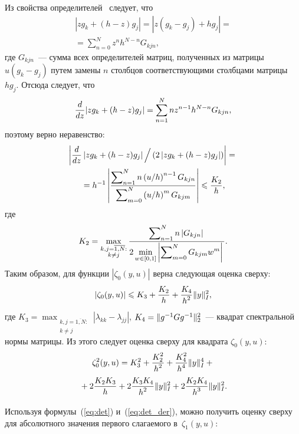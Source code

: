 \begin{multicols}{2}
 \noindent
 Из свойства определителей~\cite{MN_2019} следует, что
 \begin{multline}
 |z g_k+(h-z)g_j| =\left\vert z (g_k-g_j)+hg_j\right\vert ={}\\
 {}=\sum\limits_{n=0}^N z^nh^{N-
n}G_{kjn},
 \label{eq:det}
 \end{multline}
 где $G_{kjn}$~--- сумма всех определителей матриц, полученных из матрицы 
$u (g_k-g_j)$ путем замены $n$ столбцов соответствующими столбцами 
мат\-ри\-цы~$hg_j$. Отсюда следует, что
 \begin{equation}
 \displaystyle\frac{\displaystyle d\mathstrut}{\displaystyle dz\mathstrut} |z g_k+(h-z)g_j| = \sum\limits_{n=1}^N nz^{n-1}h^{N-
n}G_{kjn},
 \label{eq:det_der}
 \end{equation}
 поэтому верно неравенство:
\begin{multline*}
\left|
 \displaystyle\frac{\displaystyle d\mathstrut}{\displaystyle dz\mathstrut}\left\vert z g_k+(h-z)g_j\right\vert \Big/ 
 \left(2\left\vert z g_k+(h-z)g_j\right\vert \right) \right|
 ={}\\
 {}=h^{-1}
 \left|
 \displaystyle\frac{\displaystyle \sum\nolimits_{n=1}^N n\left({u}/{h}\right)^{n-
1}G_{kjn}\mathstrut}{\displaystyle \sum\nolimits_{m=0}^N \left({u}/{h}\right)^mG_{kjm}\mathstrut}
 \right|
 \leqslant \displaystyle\frac{\displaystyle K_2\mathstrut}{\displaystyle h\mathstrut},
 \end{multline*}
 где 
$$
K_2 = \max\limits_{\substack{{k,j=\overline{1,N}:}\\ {k\neq 
j}}}\displaystyle\frac{\displaystyle \sum\nolimits_{n=1}^N n\left|G_{kjn}\right|\mathstrut}{\displaystyle 2\min_{w \in[0,1]} 
\left| \sum\nolimits_{m=0}^N G_{kjm} w^m\right|\mathstrut}.
$$
 Таким образом, для функции $|\zeta_0(y,u)|$ верна следующая оценка 
сверху:
$$
 |\zeta_0(y,u)| \leqslant K_3 + \displaystyle\frac{\displaystyle K_2\mathstrut}{\displaystyle h\mathstrut} + \displaystyle\frac{\displaystyle K_4\mathstrut}{\displaystyle h^2\mathstrut}\|y\|^2_I,
 $$
 где $K_3 = \max\nolimits_{\substack{{k,j=\overline{1,N}:}\\ { k \neq 
j}}}|\lambda_{kk}-\lambda_{jj}|$, $K_4 \hm= \|g^{-1}Gg^{-1}\|^2_2$~--- 
квадрат спектральной нормы мат\-ри\-цы. Из этого следует оценка сверху для 
квадрата $\zeta_0(y,u)$:
 \begin{multline*} %
 \zeta_0^2(y,u)= K_3^2 + \fr{K_2^2}{h^2}+\fr{K_4^2}{h^4}\|y\|^4_I+{}\\
 {}+
 2\fr{K_2K_3}{h}+ 2\fr{K_3K_4}{h^2}\|y\|^2_I + 
2\fr{K_2K_4}{h^3}\|y\|^2_I.
 \end{multline*}

 Используя формулы~(\ref{eq:det}) и~(\ref{eq:det_der}), можно получить 
оценку сверху для абсолютного значения первого слагаемого 
в~$\zeta_1(y,u)$:


\end{multicols}
